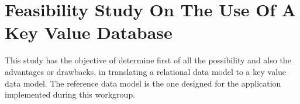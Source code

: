 \chapter{Feasibility Study On The Use Of A Key Value Database}

This study has the objective of determine first of all the possibility and also
the advantages or drawbacks, in translating a relational data model to a key
value data model. The reference data model is the one designed for the
application implemented during this workgroup.



